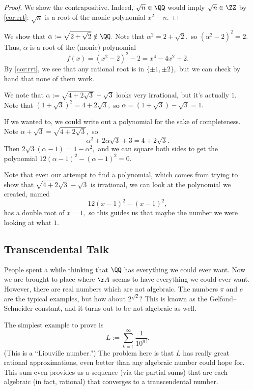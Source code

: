 \begin{proof}
    We show the contrapositive. Indeed, $\sqrt n\in\QQ$ would imply $\sqrt n\in\ZZ$ by \autoref{cor:rrt}: $\sqrt n$ is a root of the monic polynomial $x^2-n.$
\end{proof}
\begin{ex}
    We show that $\alpha:=\sqrt{2+\sqrt2}\notin\QQ.$ Note that $\alpha^2=2+\sqrt2,$ so $\left(\alpha^2-2\right)^2=2.$ Thus, $\alpha$ is a root of the (monic) polynomial
    \[f(x)=\left(x^2-2\right)^2-2=x^4-4x^2+2.\]
    By \autoref{cor:rrt}, we see that any rational root is in $\{\pm1,\pm2\},$ but we can check by hand that none of them work.
\end{ex}
\begin{ex}
    We note that $\alpha:=\sqrt{4+2\sqrt3}-\sqrt3$ looks very irrational, but it's actually $1.$ Note that $\left(1+\sqrt3\right)^2=4+2\sqrt3,$ so $\alpha=(1+\sqrt3)-\sqrt3=1.$
    
    If we wanted to, we could write out a polynomial for the sake of completeness. Note $\alpha+\sqrt3=\sqrt{4+2\sqrt3},$ so
    \[\alpha^2+2\alpha\sqrt3+3=4+2\sqrt3.\]
    Then $2\sqrt3(\alpha-1)=1-\alpha^2,$ and we can square both sides to get the polynomial $12(\alpha-1)^2-\left(\alpha-1\right)^2=0.$
\end{ex}
Note that even our attempt to find a polynomial, which comes from trying to show that $\sqrt{4+2\sqrt3}-\sqrt3$ is irrational, we can look at the polynomial we created, named
\[12(x-1)^2-\left(x-1\right)^2,\]
has a double root of $x=1,$ so this guides us that maybe the number we were looking at what $1.$

\subsection{Transcendental Talk}
People spent a while thinking that $\QQ$ has everything we could ever want. Now we are brought to place where $\AA$ seems to have everything we could ever want. However, there are real numbers which are not algebraic. The numbers $\pi$ and $e$ are the typical examples, but how about $2^{\sqrt2}$? This is known as the Gelfond--Schneider constant, and it turns out to be not algebraic as well.

The simplest example to prove is
\[L:=\sum_{k=1}^\infty\frac1{10^{n!}}.\]
(This is a ``Liouville number.'') The problem here is that $L$ has really great rational approximations, even better than any algebraic number could hope for. This sum even provides us a sequence (via the partial sums) that are each algebraic (in fact, rational) that converges to a transcendental number.


